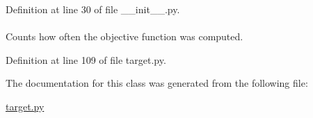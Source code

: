 \-Definition at line 30 of file \-\_\-\-\_\-init\-\_\-\-\_\-.\-py.

\hypertarget{classforcebalance_1_1target_1_1Target_ad4cd0ab38d8fc97d3e7a6e22ce130a16}{
\paragraph[{xct}]{}}\label{classforcebalance_1_1target_1_1Target_ad4cd0ab38d8fc97d3e7a6e22ce130a16}


\-Counts how often the objective function was computed. 



\-Definition at line 109 of file target.\-py.



\-The documentation for this class was generated from the following file\-:\begin{DoxyCompactItemize}
\item 
\hyperlink{target_8py}{target.\-py}\end{DoxyCompactItemize}
